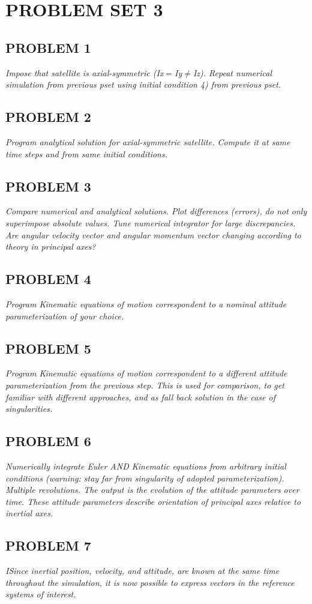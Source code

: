 \section{\Large PROBLEM SET 3}
\subsection{PROBLEM 1}
\textit{Impose that satellite is axial-symmetric (Ix$=$Iy$\neq$Iz). Repeat numerical simulation from previous pset using initial condition 4) from previous pset.}


\subsection{PROBLEM 2}
\textit{Program analytical solution for axial-symmetric satellite. Compute it at same time steps and from same initial conditions.}


\subsection{PROBLEM 3}
\textit{Compare numerical and analytical solutions. Plot differences (errors), do not only superimpose absolute values. Tune numerical integrator for large discrepancies. Are angular velocity vector and angular momentum vector changing according to theory in principal axes?}


\subsection{PROBLEM 4}
\textit{Program Kinematic equations of motion correspondent to a nominal attitude parameterization of your choice.}


\subsection{PROBLEM 5}
\textit{Program Kinematic equations of motion correspondent to a different attitude parameterization from the previous step. This is used for comparison, to get familiar with different approaches, and as fall back solution in the case of singularities.}


\subsection{PROBLEM 6}
\textit{Numerically integrate Euler AND Kinematic equations from arbitrary initial conditions (warning: stay far from singularity of adopted parameterization). Multiple revolutions. The output is the evolution of the attitude parameters over time. These attitude parameters describe orientation of principal axes relative to inertial axes.}


\subsection{PROBLEM 7}
\textit{ISince inertial position, velocity, and attitude, are known at the same time throughout the simulation, it is now possible to express vectors in the reference systems of interest.}

